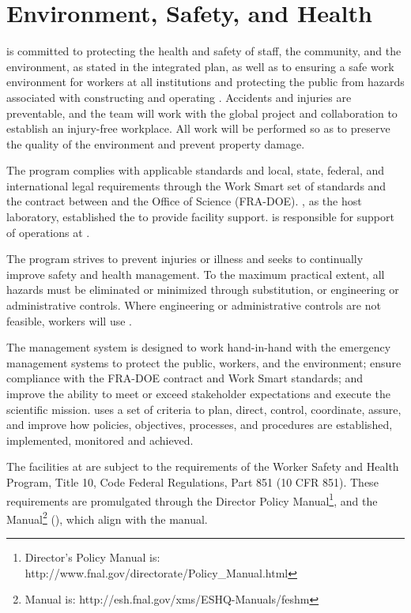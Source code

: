 \chapter{Environment, Safety, and Health}
\label{vl:tc-ESH}



 is committed to protecting the health and safety of
staff, the community, and the environment, as stated in the
 integrated  plan, as well as to ensuring a
safe work environment for  workers at all institutions and
protecting the public from hazards associated with constructing and
operating .  Accidents and injuries are preventable, and
the  team will work with the global 
project and collaboration to establish an injury-free workplace.
All work will be performed so as to preserve  the quality of the environment and
prevent property damage.

The   program complies with applicable
standards and local, state, federal, and international legal
requirements through the  Work Smart set of standards and the
contract between  and the 
Office of Science (FRA-DOE). \fnal, as the host laboratory,
established the  to provide facility support.
 is responsible for support of 
operations at .

The   program strives to prevent
injuries or illness and seeks to continually improve safety and health
management.  To the maximum practical extent, all hazards must be
eliminated or minimized through substitution, or engineering or
administrative controls.  Where engineering or administrative controls
are not feasible, workers will use .

The   management system is
designed to work hand-in-hand with the  emergency
management systems to protect the public, workers, and the environment;
ensure compliance with the FRA-DOE contract and \fnal Work Smart
standards; and improve the  ability to meet or
exceed stakeholder expectations and execute the
scientific mission.   uses a set of criteria to plan, direct,
control, coordinate, assure, and improve how  policies,
objectives, processes, and procedures are established, implemented,
monitored and achieved.

The  facilities at  are subject to
the requirements of the  Worker Safety and Health Program,
Title 10, Code Federal Regulations, Part 851 (10 CFR 851). These
requirements are promulgated through the \fnal Director Policy
Manual\footnote{\fnal Director's Policy Manual is:
  http://www.fnal.gov/directorate/Policy\_Manual.html}, and the \fnal
{} Manual\footnote{\fnal {} Manual is:
  http://esh.fnal.gov/xms/ESHQ-Manuals/feshm} (), which
align with the   manual.


